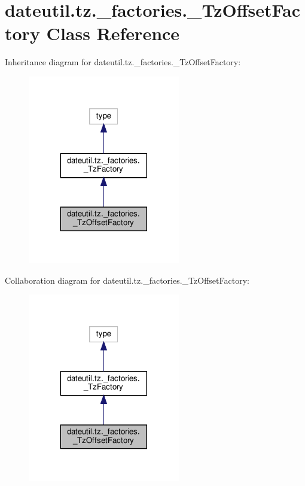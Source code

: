\hypertarget{classdateutil_1_1tz_1_1__factories_1_1__TzOffsetFactory}{}\section{dateutil.\+tz.\+\_\+factories.\+\_\+\+Tz\+Offset\+Factory Class Reference}
\label{classdateutil_1_1tz_1_1__factories_1_1__TzOffsetFactory}


Inheritance diagram for dateutil.\+tz.\+\_\+factories.\+\_\+\+Tz\+Offset\+Factory\+:
\nopagebreak
\begin{figure}[H]
\begin{center}
\leavevmode
\includegraphics[width=188pt]{classdateutil_1_1tz_1_1__factories_1_1__TzOffsetFactory__inherit__graph}
\end{center}
\end{figure}


Collaboration diagram for dateutil.\+tz.\+\_\+factories.\+\_\+\+Tz\+Offset\+Factory\+:
\nopagebreak
\begin{figure}[H]
\begin{center}
\leavevmode
\includegraphics[width=188pt]{classdateutil_1_1tz_1_1__factories_1_1__TzOffsetFactory__coll__graph}
\end{center}
\end{figure}
